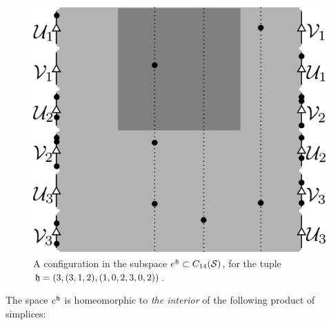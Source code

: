 \begin{figure}\centering
 \includegraphics[scale=0.7]{figures/defetup.png}
 \caption{A configuration in the subspace $e^{\mathfrak{h}}\subset C_{14}(\mathcal{S})$, for the tuple $\mathfrak{h}=(3,(3,1,2),(1,0,2,3,0,2))$. }
\label{fig:defetup}
\end{figure}


The space $e^{\mathfrak{h}}$ is homeomorphic to \emph{the interior} of the following product of simplices:

